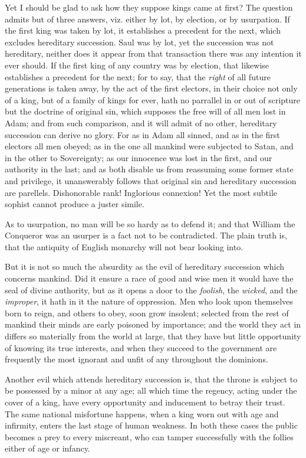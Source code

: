 \documentclass[12pt, twocolumn]{book}
\begin{document}
    Yet I should be glad to ask how they suppose kings came at first? The question admits but of three answers, viz. either by lot, by election, or by usurpation. If the first king was taken by lot, it establishes a precedent for the next, which excludes hereditary succession. Saul was by lot, yet the succession was not hereditary, neither does it appear from that transaction there was any intention it ever should. If the first king of any country was by election, that likewise establishes a precedent for the next; for to say, that the \textit{right} of all future generations is taken away, by the act of the first electors, in their choice not only of a king, but of a family of kings for ever, hath no parrallel in or out of scripture but the doctrine of original sin, which supposes the free will of all men lost in Adam; and from such comparison, and it will admit of no other, hereditary succession can derive no glory. For as in Adam all sinned, and as in the first electors all men obeyed; as in the one all mankind were subjected to Satan, and in the other to Sovereignty; as our innocence was lost in the first, and our authority in the last; and as both disable us from reassuming some former state and privilege, it unanswerably follows that original sin and hereditary succession are parellels. Dishonorable rank! Inglorious connexion! Yet the most subtile sophist cannot produce a juster simile.

    As to usurpation, no man will be so hardy as to defend it; and that William the Conqueror was an usurper is a fact not to be contradicted. The plain truth is, that the antiquity of English monarchy will not bear looking into.

    But it is not so much the absurdity as the evil of hereditary succession which concerns mankind. Did it ensure a race of good and wise men it would have the seal of divine authority, but as it opens a door to the \textit{foolish}, the \textit{wicked}, and the \textit{improper}, it hath in it the nature of oppression. Men who look upon themselves born to reign, and others to obey, soon grow insolent; selected from the rest of mankind their minds are early poisoned by importance; and the world they act in differs so materially from the world at large, that they have but little opportunity of knowing its true interests, and when they succeed to the government are frequently the most ignorant and unfit of any throughout the dominions.

    Another evil which attends hereditary succession is, that the throne is subject to be possessed by a minor at any age; all which time the regency, acting under the cover of a king, have every opportunity and inducement to betray their trust. The same national misfortune happens, when a king worn out with age and infirmity, enters the last stage of human weakness. In both these cases the public becomes a prey to every miscreant, who can tamper successfully with the follies either of age or infancy.
\end{document}
